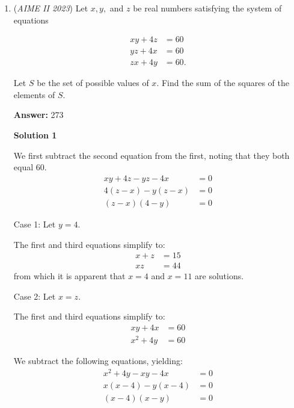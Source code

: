 \begin{enumerate}
 



\textbf{Solution 8}

Notice that $\angle APC = 90^{\circ}$, $\angle BPA = 135^{\circ}$, and $\angle CPB = 135^{\circ}$ (from Solution 4). Now let $a = 0$ and $p = 10i$. Then by the angle restrictions $c = m + 10i$ and $b = -n + (n+10)i$ for some $m, n$. Since $\angle BAC = 90^{\circ}$, $ci = b$, or $(m + 10i)i = -n + (n+10)i$. Therefore $n = 10$, $AB = \sqrt{10^2 + 20^2} = \sqrt{500}$, and $[ABC] = \frac{1}{2} AB^2 = \boxed{250}$.

 


	\item (\textit{AIME II 2023}) Let $x,y,$ and $z$ be real numbers satisfying the system of equations

 \begin{align*} xy + 4z &= 60 \\ yz + 4x &= 60 \\ zx + 4y &= 60. \end{align*}

Let $S$ be the set of possible values of $x.$ Find the sum of the squares of the elements of $S.$

 \textbf{Answer: }273



\textbf{Solution 1}

We first subtract the second equation from the first, noting that they both equal $60$. 
 \begin{align*} xy+4z-yz-4x&=0 \\ 4(z-x)-y(z-x)&=0 \\ (z-x)(4-y)&=0 \end{align*}


 Case 1: Let $y=4$.

 The first and third equations simplify to:
 \begin{align*} x+z&=15 \\ xz&=44 \end{align*}
from which it is apparent that $x=4$ and $x=11$ are solutions.

 Case 2: Let $x=z$.

 The first and third equations simplify to:
 \begin{align*} xy+4x&=60 \\ x^2+4y&=60 \end{align*}


 We subtract the following equations, yielding:
 \begin{align*} x^2+4y-xy-4x&=0 \\ x(x-4)-y(x-4)&=0 \\ (x-4)(x-y)&=0 \end{align*}



\end{enumerate}
